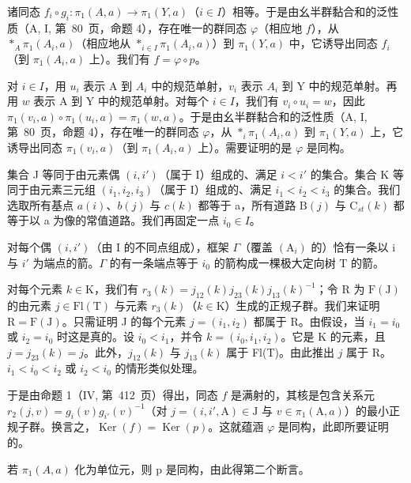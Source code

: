 诸同态 \(f_i \circ g_i \colon \pi_1(A, a) \to \pi_1(Y, a)\)（\(i \in I\)）相等。于是由幺半群黏合和的泛性质（A, I, 第~80~页，命题 4），存在唯一的群同态 \(\varphi\)（相应地 \(f\)），从 \(*_{A} \pi_1(A_i, a)\)（相应地从 \(*_{i \in I} \pi_1(A_i, a)\)）到 \(\pi_1(Y, a)\) 中，它诱导出同态 \(f_i\)（到 \(\pi_1(A_i, a)\) 上）。我们有 \(f = \varphi \circ p\)。

对 \(i \in I\)，用 \(u_i\) 表示 A 到 \(A_i\) 中的规范单射，\(v_i\) 表示 \(A_i\) 到 Y 中的规范单射。再用 \(w\) 表示 A 到 Y 中的规范单射。对每个 \(i \in I\)，我们有 \(v_i \circ u_i = w\)，因此 \(\pi_1(v_i, a) \circ \pi_1(u_i, a) = \pi_1(w, a)\)。于是由幺半群黏合和的泛性质（A, I, 第~80~页，命题 4），存在唯一的群同态 \(\varphi\)，从 \(*_{i} \pi_1(A_i, a)\) 到 \(\pi_1(Y, a)\) 上，它诱导出同态 \(\pi_1(v_i, a)\)（到 \(\pi_1(A_i, a)\) 上）。需要证明的是 \(\varphi\) 是同构。

集合 J 等同于由元素偶 \((i, i')\)（属于 I）组成的、满足 \(i < i'\) 的集合。集合 K 等同于由元素三元组 \((i_{1}, i_{2}, i_{3})\)（属于 I）组成的、满足 \(i_{1} < i_{2} < i_{3}\) 的集合。我们选取所有基点 \(a(i)\)、\(b(j)\) 与 \(c(k)\) 都等于 a，所有道路 \(\mathrm{B}(j)\) 与 \(\mathrm{C}_{st}(k)\) 都等于以 a 为像的常值道路。我们再固定一点 \(i_{0} \in I\)。

对每个偶 \((i, i')\)（由 I 的不同点组成），框架 \(\Gamma\)（覆盖 \((\mathrm{A}_{i})\) 的）恰有一条以 i 与 \(i'\) 为端点的箭。\(\Gamma\) 的有一条端点等于 \(i_{0}\) 的箭构成一棵极大定向树 T 的箭。

对每个元素 \(k \in \mathrm{K}\)，我们有 \(r_3(k) = j_{12}(k)j_{23}(k)j_{13}(k)^{-1}\)；令 R 为 \(\mathrm{F(J)}\) 的由元素 \(j \in \mathrm{Fl(T)}\) 与元素 \(r_3(k)\)（\(k \in \mathrm{K}\)）生成的正规子群。我们来证明 \(\mathrm{R} = \mathrm{F(J)}\)。只需证明 J 的每个元素 \(j = (i_1, i_2)\) 都属于 R。由假设，当 \(i_1 = i_0\) 或 \(i_2 = i_0\) 时这是真的。设 \(i_0 < i_1\)，并令 \(k = (i_0, i_1, i_2)\)。它是 K 的元素，且 \(j = j_{23}(k) = j\)。此外，\(j_{12}(k)\) 与 \(j_{13}(k)\) 属于 Fl(T)。由此推出 \(j\) 属于 R。\(i_1 < i_0 < i_2\) 或 \(i_2 < i_0\) 的情形类似处理。

于是由命题 1（IV, 第~412~页）得出，同态 \(f\) 是满射的，其核是包含关系元 \(r_2(j,v) = g_i(v)g_{i'}(v)^{-1}\)（对 \(j = (i,i',\mathrm{A}) \in \mathrm{J}\) 与 \(v \in \pi_1(\mathrm{A},a)\)）的最小正规子群。换言之，\(\operatorname{Ker}(f) = \operatorname{Ker}(p)\)。这就蕴涵 \(\varphi\) 是同构，此即所要证明的。

若 \(\pi_{1}(A,a)\) 化为单位元，则 p 是同构，由此得第二个断言。


